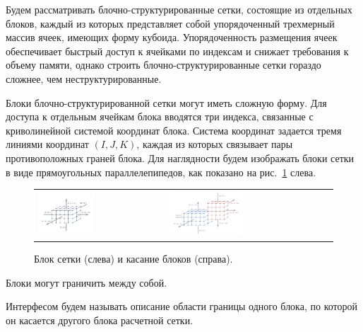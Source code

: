 Будем рассматривать блочно-структурированные сетки, состоящие из отдельных блоков, каждый из которых представляет собой упорядоченный трехмерный массив ячеек, имеющих форму кубоида.
Упорядоченность размещения ячеек обеспечивает быстрый доступ к ячейками по индексам и снижает требования к объему памяти, однако строить блочно-структурированные сетки гораздо сложнее, чем неструктурированные.

Блоки блочно-структурированной сетки могут иметь сложную форму.
Для доступа к отдельным ячейкам блока вводятся три индекса, связанные с криволинейной системой координат блока.
Система координат задается тремя линиями координат $(I, J, K)$, каждая из которых связывает пары противоположных граней блока.
Для наглядности будем изображать блоки сетки в виде прямоугольных параллелепипедов, как показано на рис.~\ref{fig:text_2_block_block} слева.

\begin{figure}[ht]
\centering
\begin{tabular}{ll}
\includegraphics[width=0.45\textwidth]{fig/par_1-block.pdf}
&
\includegraphics[width=0.45\textwidth]{fig/par_2-block-block.pdf}
\end{tabular}
\singlespacing
{}\caption{Блок сетки (слева) и касание блоков (справа).}
\label{fig:text_2_block_block}
\end{figure}

Блоки могут граничить между собой.

\begin{definition}
Интерфесом будем называть описание области границы одного блока, по которой он касается другого блока расчетной сетки.
\end{definition}


